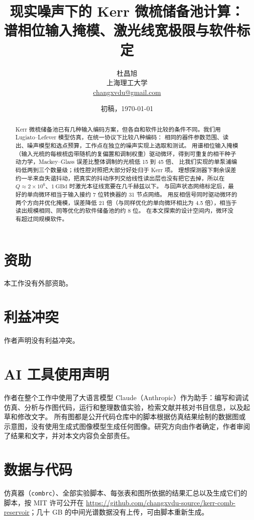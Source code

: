 \documentclass[11pt,a4paper]{ctexart}
\title{现实噪声下的 Kerr 微梳储备池计算：\\谱相位输入掩模、激光线宽极限与软件标定}
\author{杜昌旭\\[2pt]
\small 上海理工大学\\
\small \href{mailto:changxvdu@gmail.com}{changxvdu@gmail.com}}
\date{初稿，\today}
\begin{document}
\maketitle

\begin{abstract}
Kerr 微梳储备池已有几种输入编码方案，但各自和软件比较的条件不同。我们用 Lugiato--Lefever 模型仿真，在统一协议下比较八种编码：
相同的器件参数范围、读出、噪声模型和选点预算，工作点在独立的噪声实现上选取和测试。
用谱相位输入掩模（输入光梳的每根梳齿带随机的复偏置和调制权重）驱动微环，得到可重复的相干种子动力学，Mackey--Glass 误差比整体调制的光梳低 15 到 45 倍、
比我们实现的单泵浦编码低两到三个数量级；线性腔对照把大部分好处归于 Kerr 项。
理想探测器下剩余误差约一半来自失谐抖动，把真实的抖动序列交给线性读出层也没有把它去掉，所以在 $Q\approx2\times10^{6}$、$1~\mathrm{GBd}$ 时激光本征线宽要在几千赫兹以下。
与回声状态网络标定后，最好的单向微环相当于输入接约 7 位转换器的 31 节点网络。
用反相信号同时驱动微环的两个方向并优化掩模，误差降低 21 倍（与同样优化的单向微环相比为 4.5 倍），相当于读出规模相同、同等优化的软件储备池的约 8 位。
在本文探索的设计空间内，微环没有超过同规模软件。
\end{abstract}













\section*{资助}
本工作没有外部资助。

\section*{利益冲突}
作者声明没有利益冲突。

\section*{AI 工具使用声明}
作者在整个工作中使用了大语言模型 Claude（Anthropic）作为助手：编写和调试仿真、分析与作图代码，运行和整理数值实验，检索文献并核对书目信息，以及起草和修改文字。
所有图都是公开代码仓库中的脚本根据仿真结果绘制的数据图或示意图，没有使用生成式图像模型生成任何图像。研究方向由作者确定，作者审阅了结果和文字，并对本文内容负全部责任。

\section*{数据与代码}
仿真器（\texttt{combrc}）、全部实验脚本、每张表和图所依据的结果汇总以及生成它们的脚本，按 MIT 许可公开在
\url{https://github.com/changxvdu-source/kerr-comb-reservoir}；几十 GB 的中间光谱数据没有上传，可由脚本重新生成。



\end{document}
